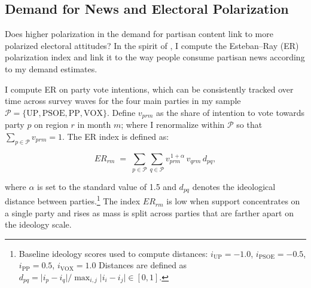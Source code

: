 \documentclass[12pt]{article}
\begin{document}

	\subsection{Demand for News and Electoral Polarization}
	
	
	

Does higher polarization in the demand for partisan content link to more polarized electoral attitudes?  In the spirit of \cite{martin2017}, I 
compute the Esteban–Ray (ER) polarization index and link it to the way people consume partisan news according to my demand estimates.

I compute ER on party vote intentions, which can be consistently tracked over time across survey waves  for the four main parties in my sample $\mathcal{P}=\{\mathrm{UP},\mathrm{PSOE},\mathrm{PP},\mathrm{VOX}\}$. Define $v_{prm}$ as the share of intention to vote towards party $p$ on region $r$ in month $m$; where I renormalize within $\mathcal{P}$ so that $\sum_{p\in\mathcal{P}} v_{prm}=1$. The ER index is defined as: 

\begin{equation}
	ER_{rm} \;=\; 
	\displaystyle\sum_{p\in\mathcal{P}} \sum_{q\in\mathcal{P}} 
	v_{prm}^{\,1+\alpha}\, v_{qrm}\, d_{pq},
		\label{eq:er}
\end{equation}


where $\alpha$ is set to the standard value of 1.5 and $d_{pq}$ denotes the  ideological distance between parties.\footnote{Baseline ideology scores used to compute distances: $i_{\mathrm{UP}}=-1.0$, $i_{\mathrm{PSOE}}=-0.5$, $i_{\mathrm{PP}}=0.5$, $i_{\mathrm{VOX}}=1.0$ Distances are defined as $d_{pq}=\lvert i_p-i_q\rvert/\max_{i,j}\lvert i_i-i_j\rvert \in [0,1]$.} The index $ER_{rm}$ is low when support concentrates on a single party and rises as mass is split across parties that are farther apart on the ideology scale.
\end{document}
